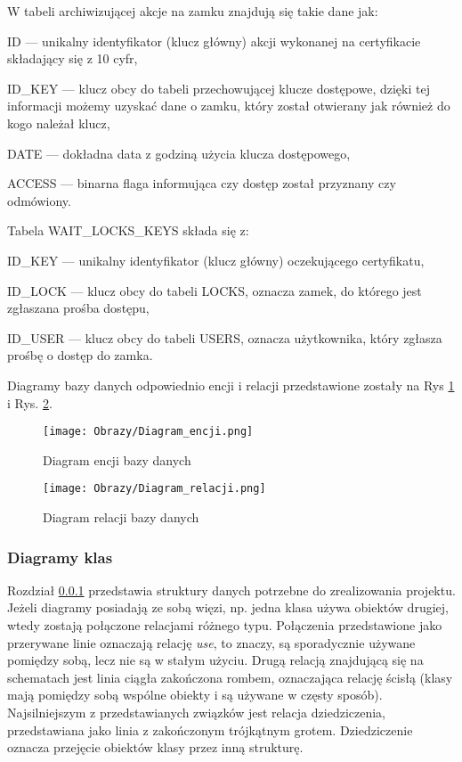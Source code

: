 W tabeli archiwizującej akcje na zamku znajdują się takie dane jak:
\begin{itemize*}
	\item {ID} --- unikalny identyfikator (klucz główny) akcji wykonanej na certyfikacie składający się z 10 cyfr,
	\item {ID\_KEY} --- klucz obcy do tabeli przechowującej klucze dostępowe, dzięki tej informacji możemy uzyskać dane o zamku, który został otwierany jak również do kogo należał klucz,
	\item {DATE} --- dokładna data z godziną użycia klucza dostępowego,
	\item {ACCESS} --- binarna flaga informująca czy dostęp został przyznany czy odmówiony.
\end{itemize*}

Tabela WAIT\_LOCKS\_KEYS składa się z:
\begin{itemize*}
	\item {ID\_KEY} --- unikalny identyfikator (klucz główny) oczekującego certyfikatu,
	\item{ID\_LOCK} --- klucz obcy do tabeli LOCKS, oznacza zamek, do którego jest zgłaszana prośba dostępu,
	\item {ID\_USER} --- klucz obcy do tabeli USERS, oznacza użytkownika, który zgłasza prośbę o dostęp do zamka.
\end{itemize*}

Diagramy bazy danych odpowiednio encji i relacji przedstawione zostały na Rys \ref{diagram:diagram encji} i Rys. \ref{diagram:diagram relacji}\cite{BD}.  

\begin{figure}[!h]
	\centering
	\texttt{[image: Obrazy/Diagram\_encji.png]}
	\caption{Diagram encji bazy danych}
	\label{diagram:diagram encji}
\end{figure}
\newpage
\begin{figure}[!h]
	\centering
	\texttt{[image: Obrazy/Diagram\_relacji.png]}
	\caption{Diagram relacji bazy danych}
	\label{diagram:diagram relacji}
\end{figure}
\newpage

\subsubsection{Diagramy klas}\label{sec:diagramy klas}
Rozdział \ref{sec:diagramy klas} przedstawia struktury danych potrzebne do zrealizowania projektu. Jeżeli diagramy posiadają ze sobą więzi, np. jedna klasa używa obiektów drugiej, wtedy zostają połączone relacjami różnego typu. Połączenia przedstawione jako przerywane linie oznaczają relację \textit{use}, to znaczy, są sporadycznie używane pomiędzy sobą, lecz nie są w stałym użyciu. Drugą relacją znajdującą się na schematach jest linia ciągła zakończona rombem, oznaczająca relację ścisłą (klasy mają pomiędzy sobą wspólne obiekty i są używane w częsty sposób). Najsilniejszym z przedstawianych związków jest relacja dziedziczenia, przedstawiana jako linia z zakończonym trójkątnym grotem. Dziedziczenie oznacza przejęcie obiektów klasy przez inną strukturę.
